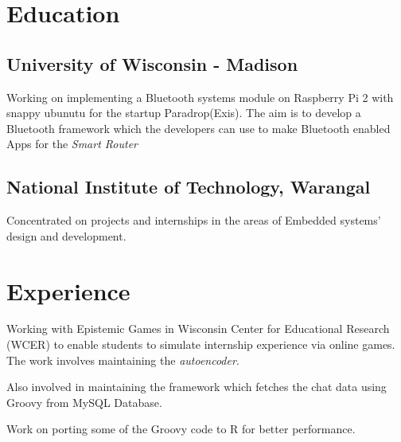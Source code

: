 \documentclass[letterpaper]{deedy-resume} %
\begin{document}
\begin{minipage}[t]{0.76\textwidth} %



\section{Education}

\subsection{University of Wisconsin - Madison}
\vspace{\topsep} %
\begin{tightitemize}
\item Working on implementing a Bluetooth systems module on Raspberry Pi 2 with snappy ubunutu for the startup Paradrop(Exis). The aim is to develop a Bluetooth framework
 which the developers can use to make Bluetooth enabled Apps for the \textit{Smart Router}
\end{tightitemize}

\sectionspace %
\vspace{1 mm}
\subsection{National Institute of Technology, Warangal}
\begin{tightitemize}
\item Concentrated on projects and internships in the areas of Embedded systems' design and development.
\end{tightitemize}


\section{Experience}

\begin{tightitemize}
\item Working with Epistemic Games in Wisconsin Center for Educational Research (WCER) to enable students to simulate internship experience via online games. The work involves maintaining the \textit{autoencoder}.
\item Also involved in maintaining the framework which fetches the chat data using Groovy from MySQL Database.
\item Work on porting some of the Groovy code to R for better performance.
\end{tightitemize}


\end{minipage}
\end{document}
